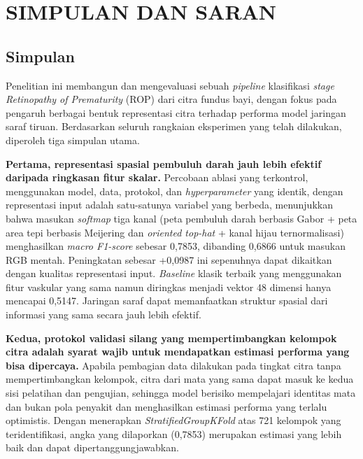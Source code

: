 
\chapter{SIMPULAN DAN SARAN}

\section{Simpulan}

Penelitian ini membangun dan mengevaluasi sebuah \textit{pipeline} klasifikasi \textit{stage}
\textit{Retinopathy of Prematurity} (ROP) dari citra fundus bayi, dengan fokus pada pengaruh
berbagai bentuk representasi citra terhadap performa model jaringan saraf tiruan. Berdasarkan
seluruh rangkaian eksperimen yang telah dilakukan, diperoleh tiga simpulan utama.

\textbf{Pertama, representasi spasial pembuluh darah jauh lebih efektif daripada ringkasan
fitur skalar.} Percobaan ablasi yang terkontrol, menggunakan model, data, protokol, dan
\textit{hyperparameter} yang identik, dengan representasi input adalah satu-satunya variabel yang berbeda, menunjukkan bahwa masukan \textit{softmap} tiga kanal (peta pembuluh
darah berbasis Gabor + peta area tepi berbasis Meijering dan \textit{oriented top-hat} +
kanal hijau ternormalisasi) menghasilkan \textit{macro F1-score} sebesar
0,7853, dibanding 0,6866 untuk masukan RGB mentah. Peningkatan sebesar +0,0987 ini
sepenuhnya dapat dikaitkan dengan kualitas representasi input. \textit{Baseline} klasik terbaik yang menggunakan fitur vaskular yang sama namun diringkas
menjadi vektor 48 dimensi hanya mencapai 0,5147. Jaringan saraf dapat memanfaatkan struktur
spasial dari informasi yang sama secara jauh lebih efektif.

\textbf{Kedua, protokol validasi silang yang mempertimbangkan kelompok citra adalah syarat
wajib untuk mendapatkan estimasi performa yang bisa dipercaya.} Apabila pembagian data
dilakukan pada tingkat citra tanpa mempertimbangkan kelompok, citra dari mata yang sama dapat
masuk ke kedua sisi pelatihan dan pengujian, sehingga model berisiko mempelajari
identitas mata dan bukan pola penyakit dan menghasilkan estimasi performa yang terlalu
optimistis. Dengan menerapkan \textit{StratifiedGroupKFold} atas 721 kelompok yang
teridentifikasi, angka yang dilaporkan (0,7853) merupakan estimasi yang lebih baik dan dapat
dipertanggungjawabkan.

